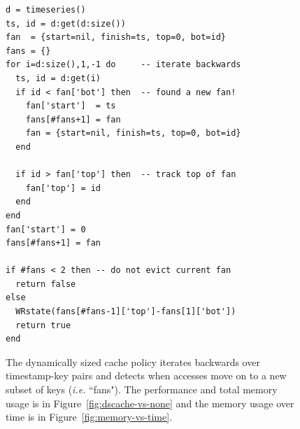 \begin{figure}[tb]
\footnotesize
\begin{verbatim}
d = timeseries()
ts, id = d:get(d:size())
fan  = {start=nil, finish=ts, top=0, bot=id}
fans = {}
for i=d:size(),1,-1 do     -- iterate backwards
  ts, id = d:get(i)
  if id < fan['bot'] then  -- found a new fan!
    fan['start']  = ts
    fans[#fans+1] = fan 
    fan = {start=nil, finish=ts, top=0, bot=id}
  end 

  if id > fan['top'] then  -- track top of fan
    fan['top'] = id 
  end 
end
fan['start'] = 0 
fans[#fans+1] = fan 

if #fans < 2 then -- do not evict current fan
  return false
else
  WRstate(fans[#fans-1]['top']-fans[1]['bot']) 
  return true
end
\end{verbatim}
\caption{The dynamically sized cache policy iterates backwards over
timestamp-key pairs and detects when accesses move on to a new subset of keys
({\it i.e.} ``fans"). The performance and total memory usage is in
Figure~\ref{fig:dscache-vs-none} and the memory usage over time is in
Figure~\ref{fig:memory-vs-time}.
\label{src:dyn-cache}}
\end{figure}

%
%
%
%
%
%

